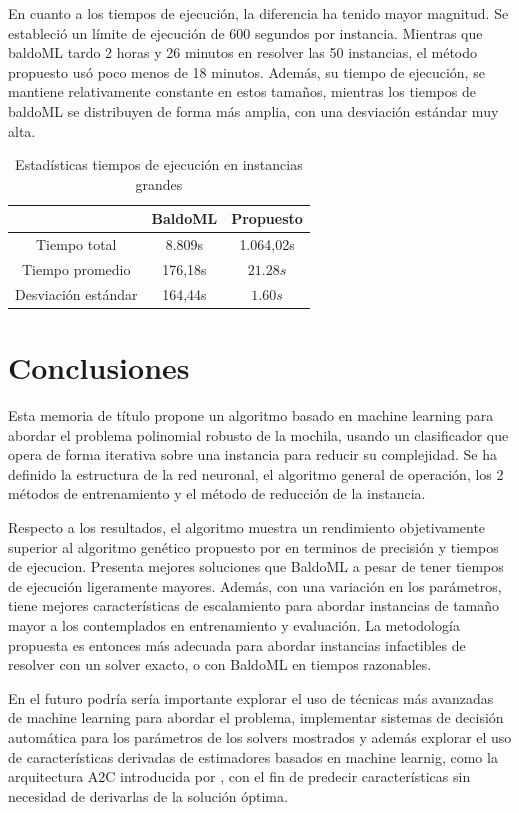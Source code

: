 \documentclass[spanish, a4paper, 12pt, openany,final]{book}
\begin{document}
En cuanto a los tiempos de ejecución, la diferencia ha tenido mayor magnitud. Se estableció un límite de ejecución de 600 segundos por instancia. Mientras que baldoML tardo 2 horas y 26  minutos en resolver las 50 instancias, el método propuesto usó poco menos de 18 minutos. Además, su tiempo de ejecución, se mantiene relativamente constante en estos tamaños, mientras los tiempos de baldoML se distribuyen de forma más amplia, con una desviación estándar muy alta.

\begin{table}[H]
	\centering
	\caption{Estadísticas tiempos de ejecución en instancias grandes}
	\begin{tabular}{|c|c|c|}
		\hline
		&BaldoML& Propuesto\\
		\hline
		Tiempo total & 8.809s & 1.064,02s\\
		\hline
		Tiempo promedio &176,18s & $21.28s$ \\
		\hline
		Desviación estándar &164,44s& $1.60s$\\
		\hline
	\end{tabular}
\end{table}


\chapter{Conclusiones}
Esta memoria de título propone un algoritmo basado en machine learning para abordar el problema polinomial robusto de la mochila, usando un clasificador que opera de forma iterativa sobre una instancia para reducir su complejidad. Se ha definido la estructura de la red neuronal, el algoritmo general de operación, los 2 métodos de entrenamiento y el método de reducción de la instancia.
 
Respecto a los resultados, el algoritmo muestra un rendimiento objetivamente superior al algoritmo genético propuesto por \cite{baldo_polynomial_2023} en terminos de precisión y tiempos de ejecucion. Presenta mejores soluciones que BaldoML a pesar de tener tiempos de ejecución ligeramente mayores. Además, con una variación en los parámetros, tiene mejores características de escalamiento para abordar instancias de tamaño mayor a los contemplados en entrenamiento y evaluación. La metodología propuesta es entonces más adecuada para abordar instancias infactibles de resolver con un solver exacto, o con BaldoML en tiempos razonables.

En el futuro podría sería importante explorar el uso de técnicas más avanzadas de machine learning para abordar el problema, implementar sistemas de decisión automática para los parámetros de los solvers mostrados y además explorar el uso de características derivadas de estimadores basados en machine learnig, como la arquitectura A2C introducida por \cite{mnih_asynchronous_2016}, con el fin de predecir características sin necesidad de derivarlas de la solución óptima.
\end{document}
